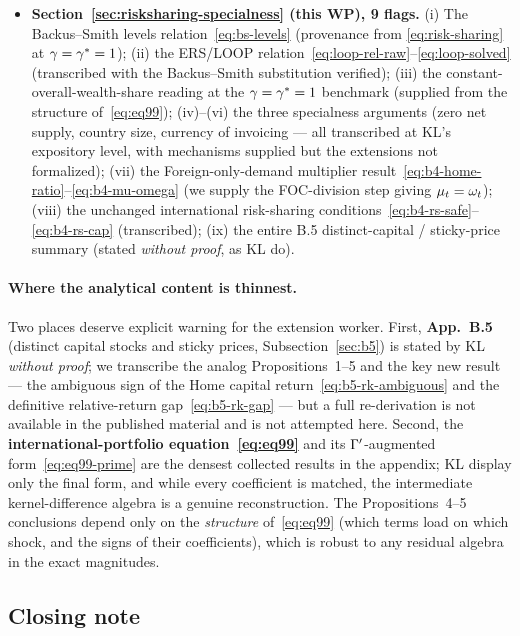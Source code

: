 \begin{itemize}[leftmargin=1.6em,itemsep=2pt]
  \item \textbf{Section~\ref{sec:risksharing-specialness} (this WP), 9 flags.}
  (i) The Backus--Smith levels relation~\eqref{eq:bs-levels} (provenance from
  \eqref{eq:risk-sharing} at $\gamma=\gamma^{*}=1$); (ii) the ERS/LOOP
  relation~\eqref{eq:loop-rel-raw}--\eqref{eq:loop-solved} (transcribed with the
  Backus--Smith substitution verified); (iii) the constant-overall-wealth-share
  reading at the $\gamma=\gamma^{*}=1$ benchmark (supplied from the structure
  of~\eqref{eq:eq99}); (iv)--(vi) the three specialness arguments
  (zero net supply, country size, currency of invoicing --- all transcribed at KL's
  expository level, with mechanisms supplied but the extensions not formalized);
  (vii) the Foreign-only-demand multiplier
  result~\eqref{eq:b4-home-ratio}--\eqref{eq:b4-mu-omega} (we supply the
  FOC-division step giving $\mu_t=\omega_t$); (viii) the unchanged international
  risk-sharing conditions~\eqref{eq:b4-rs-safe}--\eqref{eq:b4-rs-cap} (transcribed);
  (ix) the entire B.5 distinct-capital / sticky-price summary (stated
  \emph{without proof}, as KL do).
\end{itemize}

\paragraph{Where the analytical content is thinnest.} Two places deserve explicit
warning for the extension worker. First, \textbf{App.~B.5} (distinct capital
stocks and sticky prices, Subsection~\ref{sec:b5}) is stated by KL \emph{without
proof}; we transcribe the analog Propositions~1--5 and the key new result --- the
ambiguous sign of the Home capital return~\eqref{eq:b5-rk-ambiguous} and the
definitive relative-return gap~\eqref{eq:b5-rk-gap} --- but a full re-derivation is
not available in the published material and is not attempted here. Second, the
\textbf{international-portfolio equation~\eqref{eq:eq99}} and its
$\Gamma'$-augmented form~\eqref{eq:eq99-prime} are the densest collected results in
the appendix; KL display only the final form, and while every coefficient is
matched, the intermediate kernel-difference algebra is a genuine reconstruction.
The Propositions~4--5 conclusions depend only on the \emph{structure}
of~\eqref{eq:eq99} (which terms load on which shock, and the signs of their
coefficients), which is robust to any residual algebra in the exact magnitudes.

\subsection{Closing note}
\label{sec:closing}

